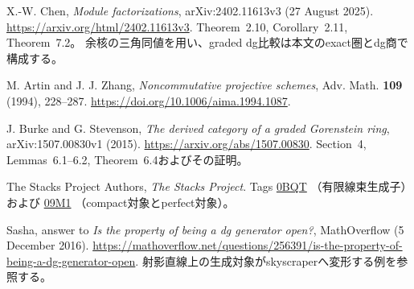 X.-W. Chen, \emph{Module factorizations}, arXiv:2402.11613v3 (27 August 2025).
\url{https://arxiv.org/html/2402.11613v3}.
Theorem~2.10, Corollary~2.11, Theorem~7.2。
余核の三角同値を用い、graded dg比較は本文のexact圏とdg商で構成する。

M. Artin and J. J. Zhang, \emph{Noncommutative projective schemes},
Adv. Math. \textbf{109} (1994), 228--287.
\url{https://doi.org/10.1006/aima.1994.1087}.

J. Burke and G. Stevenson, \emph{The derived category of a graded Gorenstein ring},
arXiv:1507.00830v1 (2015).
\url{https://arxiv.org/abs/1507.00830}.
Section~4, Lemmas~6.1--6.2, Theorem~6.4およびその証明。

The Stacks Project Authors, \emph{The Stacks Project}.
Tags \href{https://stacks.math.columbia.edu/tag/0BQT}{0BQT}
（有限線束生成子）および
\href{https://stacks.math.columbia.edu/tag/09M1}{09M1}
（compact対象とperfect対象）。

Sasha, answer to \emph{Is the property of being a dg generator open?},
MathOverflow (5 December 2016).
\url{https://mathoverflow.net/questions/256391/is-the-property-of-being-a-dg-generator-open}.
射影直線上の生成対象がskyscraperへ変形する例を参照する。
